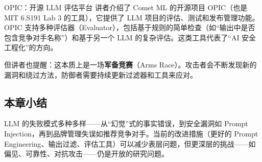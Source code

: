 \begin{knowledgebox}{OPIC：开源 LLM 评估平台}
讲者介绍了 Comet ML 的开源项目 OPIC（也是 MIT 6.S191 Lab 3 的工具），它提供了 LLM 项目的评估、测试和发布管理功能。OPIC 支持多种评估器（Evaluator），包括基于规则的简单检查（如``输出中是否包含竞争对手名称''）和基于另一个 LLM 的复杂评估。这类工具代表了``AI 安全工程化''的方向。
\end{knowledgebox}

但讲者也提醒：这本质上是一场\textbf{军备竞赛}（Arms Race）。攻击者会不断发现新的漏洞和绕过方法，防御者需要持续更新过滤器和工具来应对。

\subsection{本章小结}

LLM 的失败模式多种多样——从``幻觉''式的事实错误，到安全漏洞如 Prompt Injection，再到品牌管理失误如推荐竞争对手。当前的改进措施（更好的 Prompt Engineering、输出过滤、评估工具）可以减少表层问题，但更深层的挑战——如偏见、可靠性、对抗攻击——仍是开放的研究问题。

